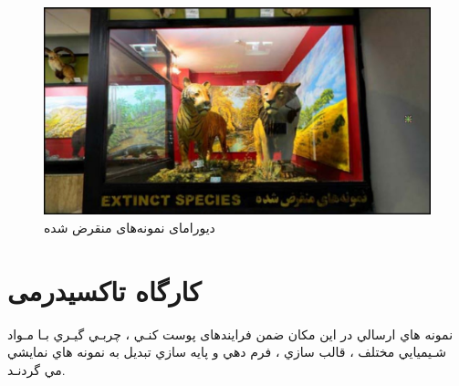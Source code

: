 \begin{figure}
    \label{fig2.2}
    \centering
    \includegraphics[scale = 0.45]{images/monqarez.jpg}
    \caption{دیورامای نمونه‌‌های منقرض شده}
\end{figure}

\section{کارگاه تاکسیدرمی}
نمونه هاي ارسالي در اين مكان ضمن فرايندهای پوست كنـي ، چربـي گيـري بـا مـواد شـيميايي
مختلف ، قالب سازي ، فرم دهي و پايه سازي تبديل به نمونه هاي نمايشي مي گردنـد.